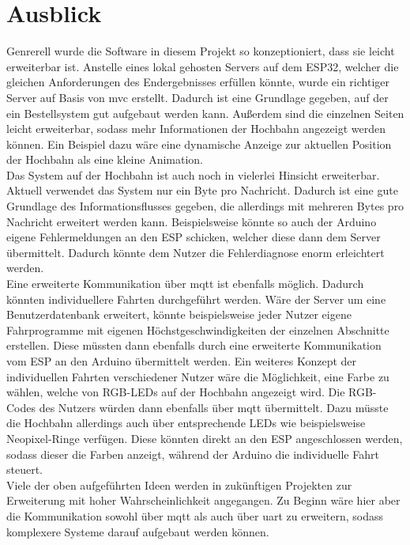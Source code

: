 \section{Ausblick}
\label{sec:ausblick}

Genrerell wurde die Software in diesem Projekt so konzeptioniert, dass sie leicht erweiterbar ist. Anstelle eines lokal gehosten Servers auf dem ESP32, welcher die gleichen Anforderungen des Endergebnisses erfüllen könnte, wurde ein richtiger Server auf Basis von \acrshort{mvc} erstellt. Dadurch ist eine Grundlage gegeben, auf der ein Bestellsystem gut aufgebaut werden kann. Außerdem sind die einzelnen Seiten leicht erweiterbar, sodass mehr Informationen der Hochbahn angezeigt werden können. Ein Beispiel dazu wäre eine dynamische Anzeige zur aktuellen Position der Hochbahn als eine kleine Animation. \\
Das System auf der Hochbahn ist auch noch in vielerlei Hinsicht erweiterbar. Aktuell verwendet das System nur ein Byte pro Nachricht. Dadurch ist eine gute Grundlage des Informationsflusses gegeben, die allerdings mit mehreren Bytes pro Nachricht erweitert werden kann. Beispielsweise könnte so auch der Arduino eigene Fehlermeldungen an den ESP schicken, welcher diese dann dem Server übermittelt. Dadurch könnte dem Nutzer die Fehlerdiagnose enorm erleichtert werden. \\
Eine erweiterte Kommunikation über \acrshort{mqtt} ist ebenfalls möglich. Dadurch könnten individuellere Fahrten durchgeführt werden. Wäre der Server um eine Benutzerdatenbank erweitert, könnte beispielsweise jeder Nutzer eigene Fahrprogramme mit eigenen Höchstgeschwindigkeiten der einzelnen Abschnitte erstellen. Diese müssten dann ebenfalls durch eine erweiterte Kommunikation vom ESP an den Arduino übermittelt werden. Ein weiteres Konzept der individuellen Fahrten verschiedener Nutzer wäre die Möglichkeit, eine Farbe zu wählen, welche von RGB-LEDs auf der Hochbahn angezeigt wird. Die RGB-Codes des Nutzers würden dann ebenfalls über \acrshort{mqtt} übermittelt. Dazu müsste die Hochbahn allerdings auch über entsprechende LEDs wie beispielsweise Neopixel-Ringe verfügen. Diese könnten direkt an den ESP angeschlossen werden, sodass dieser die Farben anzeigt, während der Arduino die individuelle Fahrt steuert. \\
Viele der oben aufgeführten Ideen werden in zukünftigen Projekten zur Erweiterung mit hoher Wahrscheinlichkeit angegangen. Zu Beginn wäre hier aber die Kommunikation sowohl über \acrshort{mqtt} als auch über \acrshort{uart} zu erweitern, sodass komplexere Systeme darauf aufgebaut werden können.\\

